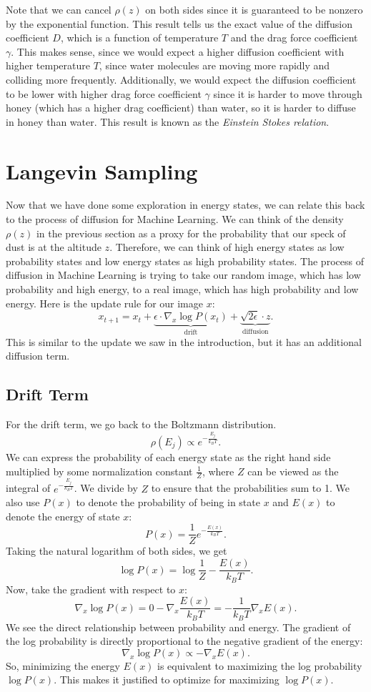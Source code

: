 \documentclass{article}
\begin{document}
Note that we can cancel $\rho(z)$ on both sides since it is guaranteed to be nonzero by the exponential function. This result tells us the exact value of the diffusion coefficient $D$, which is a function of temperature $T$ and the drag force coefficient $\gamma$. This makes sense, since we would expect a higher diffusion coefficient with higher temperature $T$, since water molecules are moving more rapidly and colliding more frequently. Additionally, we would expect the diffusion coefficient to be lower with higher drag force coefficient $\gamma$ since it is harder to move through honey (which has a higher drag coefficient) than water, so it is harder to diffuse in honey than water. This result is known as the \textit{Einstein Stokes relation}.


\section{Langevin Sampling}
Now that we have done some exploration in energy states, we can relate this back to the process of diffusion for Machine Learning. We can think of the density $\rho(z)$ in the previous section as a proxy for the probability that our speck of dust is at the altitude $z$. Therefore, we can think of high energy states as low probability states and low energy states as high probability states. The process of diffusion in Machine Learning is trying to take our random image, which has low probability and high energy, to a real image, which has high probability and low energy. Here is the update rule for our image $x$:
\[x_{t+1} = x_t + \underbrace{\epsilon \cdot \nabla_x \log P(x_t) }_{\text{drift}}+ \underbrace{\sqrt{2\epsilon} \cdot z}_{\text{diffusion}}.\]
This is similar to the update we saw in the introduction, but it has an additional diffusion term. 
\subsection{Drift Term}
For the drift term, we go back to the Boltzmann distribution. 
\[\rho(E_j) \propto e^{-\frac{E_j}{k_B T}}.\]
We can express the probability of each energy state as the right hand side multiplied by some normalization constant $\frac{1}{Z}$, where $Z$ can be viewed as the integral of $e^{-\frac{E_j}{k_B T}}$. We divide by $Z$ to ensure that the probabilities sum to 1. We also use $P(x)$ to denote the probability of being in state $x$ and $E(x)$ to denote the energy of state $x$:
\[P(x) = \frac{1}{Z} e^{-\frac{E(x)}{k_B T}}.\]
Taking the natural logarithm of both sides, we get
\[\log P(x) = \log \frac{1}{Z} -\frac{E(x)}{k_B T}.\]
Now, take the gradient with respect to $x$:
\[\nabla_x \log P(x) = 0 - \nabla_x\frac{E(x)}{k_B T}=- \frac{1}{k_B T}\nabla_x E(x).\]
We see the direct relationship between probability and energy. The gradient of the log probability is directly proportional to the negative gradient of the energy: 
\[\nabla_x \log P(x) \propto - \nabla_x E(x).\]
So, minimizing the energy $E(x)$ is equivalent to maximizing the log probability $\log P(x)$. This makes it justified to optimize for maximizing $\log P(x)$. 
\end{document}
